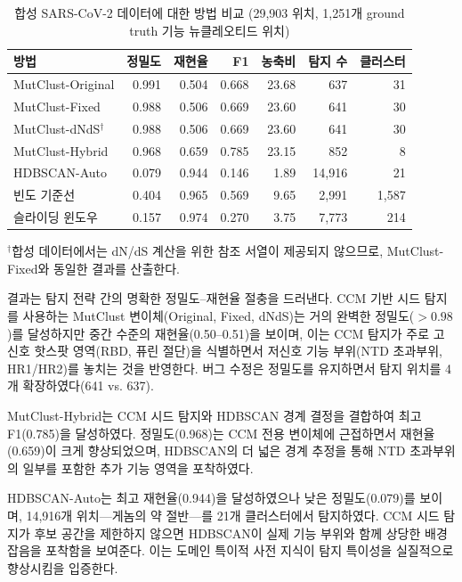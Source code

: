\begin{table}[htbp]
\centering
\caption{합성 SARS-CoV-2 데이터에 대한 방법 비교 (29,903 위치, 1,251개 ground truth 기능 뉴클레오티드 위치)}
\label{tab:method_comparison}
\begin{tabular}{lrrrrrr}
\toprule
\textbf{방법} & \textbf{정밀도} & \textbf{재현율} & \textbf{F1} & \textbf{농축비} & \textbf{탐지 수} & \textbf{클러스터} \\
\midrule
MutClust-Original & 0.991 & 0.504 & 0.668 & 23.68 & 637 & 31 \\
MutClust-Fixed & 0.988 & 0.506 & 0.669 & 23.60 & 641 & 30 \\
MutClust-dNdS$^\dagger$ & 0.988 & 0.506 & 0.669 & 23.60 & 641 & 30 \\
MutClust-Hybrid & 0.968 & 0.659 & 0.785 & 23.15 & 852 & 8 \\
HDBSCAN-Auto & 0.079 & 0.944 & 0.146 & 1.89 & 14,916 & 21 \\
\midrule
빈도 기준선 & 0.404 & 0.965 & 0.569 & 9.65 & 2,991 & 1,587 \\
슬라이딩 윈도우 & 0.157 & 0.974 & 0.270 & 3.75 & 7,773 & 214 \\
\bottomrule
\end{tabular}
\begin{minipage}{\textwidth}
\smallskip
\footnotesize $^\dagger$합성 데이터에서는 dN/dS 계산을 위한 참조 서열이 제공되지 않으므로, MutClust-Fixed와 동일한 결과를 산출한다.
\end{minipage}
\end{table}

결과는 탐지 전략 간의 명확한 정밀도--재현율 절충을 드러낸다.
CCM 기반 시드 탐지를 사용하는 MutClust 변이체(Original, Fixed, dNdS)는 거의 완벽한 정밀도($> 0.98$)를 달성하지만 중간 수준의 재현율(0.50--0.51)을 보이며, 이는 CCM 탐지가 주로 고신호 핫스팟 영역(RBD, 퓨린 절단)을 식별하면서 저신호 기능 부위(NTD 초과부위, HR1/HR2)를 놓치는 것을 반영한다.
버그 수정은 정밀도를 유지하면서 탐지 위치를 4개 확장하였다(641 vs. 637).

MutClust-Hybrid는 CCM 시드 탐지와 HDBSCAN 경계 결정을 결합하여 최고 F1(0.785)을 달성하였다.
정밀도(0.968)는 CCM 전용 변이체에 근접하면서 재현율(0.659)이 크게 향상되었으며, HDBSCAN의 더 넓은 경계 추정을 통해 NTD 초과부위의 일부를 포함한 추가 기능 영역을 포착하였다.

HDBSCAN-Auto는 최고 재현율(0.944)을 달성하였으나 낮은 정밀도(0.079)를 보이며, 14,916개 위치---게놈의 약 절반---를 21개 클러스터에서 탐지하였다.
CCM 시드 탐지가 후보 공간을 제한하지 않으면 HDBSCAN이 실제 기능 부위와 함께 상당한 배경 잡음을 포착함을 보여준다.
이는 도메인 특이적 사전 지식이 탐지 특이성을 실질적으로 향상시킴을 입증한다.

